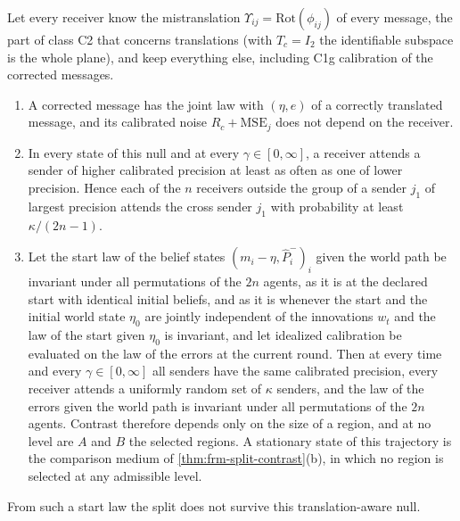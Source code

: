 \begin{proposition}\label{prop:frm-exact-fusion}
Let every receiver know the mistranslation $\Upsilon_{ij}=\mathrm{Rot}(\phi_{ij})$ of every message, the part of class C2 that concerns translations (with $T_c=I_2$ the identifiable subspace is the whole plane), and keep everything else, including C1g calibration of the corrected messages.
\begin{enumerate}
\item[(a)] A corrected message has the joint law with $(\eta,e)$ of a correctly translated message, and its calibrated noise $R_c+\mathrm{MSE}_j$ does not depend on the receiver.
\item[(b)] In every state of this null and at every $\gamma\in[0,\infty]$, a receiver attends a sender of higher calibrated precision at least as often as one of lower precision. Hence each of the $n$ receivers outside the group of a sender $j_1$ of largest precision attends the cross sender $j_1$ with probability at least $\kappa/(2n-1)$.
\item[(c)] Let the start law of the belief states $(m_i-\eta,\hat P^-_i)_{i}$ given the world path be invariant under all permutations of the $2n$ agents, as it is at the declared start with identical initial beliefs, and as it is whenever the start and the initial world state $\eta_0$ are jointly independent of the innovations $w_t$ and the law of the start given $\eta_0$ is invariant, and let idealized calibration be evaluated on the law of the errors at the current round. Then at every time and every $\gamma\in[0,\infty]$ all senders have the same calibrated precision, every receiver attends a uniformly random set of $\kappa$ senders, and the law of the errors given the world path is invariant under all permutations of the $2n$ agents. Contrast therefore depends only on the size of a region, and at no level are $A$ and $B$ the selected regions. A stationary state of this trajectory is the comparison medium of \cref{thm:frm-split-contrast}(b), in which no region is selected at any admissible level.
\end{enumerate}
From such a start law the split does not survive this translation-aware null.
\end{proposition}
